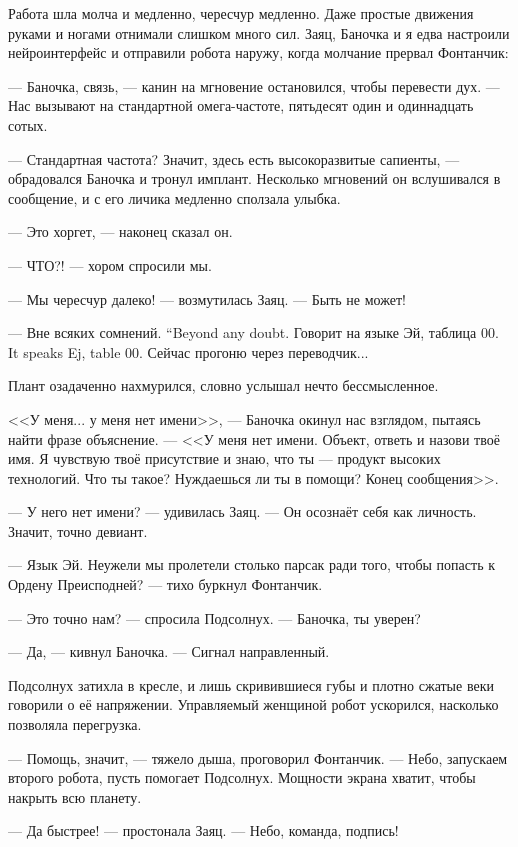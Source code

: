Работа шла молча и медленно, чересчур медленно.
Даже простые движения руками и ногами отнимали слишком много сил.
Заяц, Баночка и я едва настроили нейроинтерфейс и отправили робота наружу, когда молчание прервал Фонтанчик:

--- Баночка, связь, --- канин на мгновение остановился, чтобы перевести дух.
--- Нас вызывают на стандартной омега-частоте, пятьдесят один и одиннадцать сотых.

--- Стандартная частота?
Значит, здесь есть высокоразвитые сапиенты, --- обрадовался Баночка и тронул имплант.
Несколько мгновений он вслушивался в сообщение, и с его личика медленно сползала улыбка.

--- Это хоргет, --- наконец сказал он.

--- ЧТО?! --- хором спросили мы.

--- Мы чересчур далеко! --- возмутилась Заяц. --- Быть не может!

{--- Вне всяких сомнений.}
{``Beyond any doubt.}
{Говорит на языке Эй, таблица 00.}
{It speaks Ej, table 00.}
Сейчас прогоню через переводчик...

Плант озадаченно нахмурился, словно услышал нечто бессмысленное.

<<У меня... у меня нет имени>>, --- Баночка окинул нас взглядом, пытаясь найти фразе объяснение.
--- <<У меня нет имени.
Объект, ответь и назови твоё имя.
Я чувствую твоё присутствие и знаю, что ты --- продукт высоких технологий.
Что ты такое?
Нуждаешься ли ты в помощи?
Конец сообщения>>.

--- У него нет имени? --- удивилась Заяц.
--- Он осознаёт себя как личность.
Значит, точно девиант.

--- Язык Эй.
Неужели мы пролетели столько парсак ради того, чтобы попасть к Ордену Преисподней? --- тихо буркнул Фонтанчик.

--- Это точно нам? --- спросила Подсолнух. --- Баночка, ты уверен?

--- Да, --- кивнул Баночка. --- Сигнал направленный.

Подсолнух затихла в кресле, и лишь скривившиеся губы и плотно сжатые веки говорили о её напряжении.
Управляемый женщиной робот ускорился, насколько позволяла перегрузка.

--- Помощь, значит, --- тяжело дыша, проговорил Фонтанчик.
--- Небо, запускаем второго робота, пусть помогает Подсолнух.
Мощности экрана хватит, чтобы накрыть всю планету.

--- Да быстрее! --- простонала Заяц.
--- Небо, команда, подпись!

